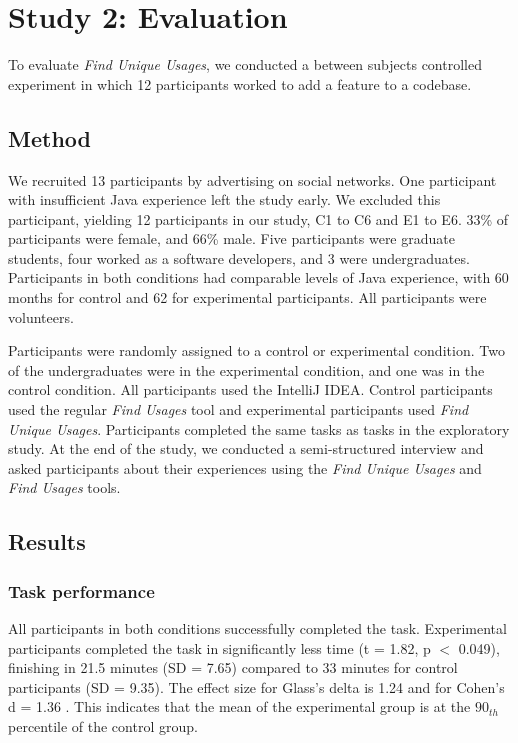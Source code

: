 \documentclass[conference]{IEEEtran}
\begin{document}
\section{Study 2: Evaluation}
To evaluate \textit{Find Unique Usages}, we conducted a between subjects controlled experiment in which 12 participants worked to add a feature to a codebase. 
\subsection{Method}
We recruited 13 participants by advertising on social networks. One participant with insufficient Java experience left the study early. We excluded this participant, yielding 12 participants in our study, C1 to C6 and E1 to E6. 
33\% of participants were female, and 66\% male. Five participants were graduate students, four worked as a software developers, and 3 were undergraduates. Participants in both conditions had comparable levels of Java experience, with 60 months for control and 62 for experimental participants. All participants were volunteers.\par

Participants were randomly assigned to a control  or experimental condition. Two of the undergraduates were in the experimental condition, and one was in the control condition.  All participants used the IntelliJ IDEA. Control participants used the regular \textit{Find Usages} tool and experimental participants used \textit{Find Unique Usages}.
Participants completed the same tasks as tasks in the exploratory study.
At the end of the study, we conducted a semi-structured interview and asked participants about their experiences using the \textit{Find Unique Usages} and \textit{Find Usages} tools.


\subsection{Results}
\subsubsection{Task performance}
All participants in both conditions successfully completed the task. Experimental participants completed the task in significantly less time (t = 1.82, p $<$ 0.049), 
finishing in 21.5 minutes (SD = 7.65) compared to 33 minutes for control participants (SD = 9.35). The effect size for Glass's delta is 1.24
and for Cohen's d = 1.36
. This indicates that the mean of the experimental group is at the $90_{th}$ percentile of the control group.  
\end{document}
